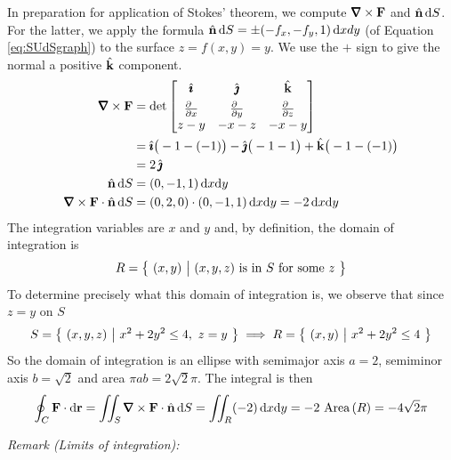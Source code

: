 \begin{eg}
In preparation for application of Stokes' theorem, we compute
$\vnabla\times\vF$ and $\hat{\mathbf{n}}\,\mathrm{d}S$. For the latter, we apply the formula
$\hat{\mathbf{n}}\,\mathrm{d}S=\pm(-f_x,-f_y,1)\,\mathrm{d}xdy$ (of Equation \eqref{eq:SUdSgraph})
to the surface $z=f(x,y)=y$. We use the $+$
sign to give the normal a positive $\hat{\mathbf{k}}$ component.
\begin{align*}
\vnabla\times\vF
&=\det\left[\begin{matrix}\hi&\hj&\hk \\[0.05in]
           \frac{\partial\hfill}{\partial x}
                 &\frac{\partial\hfill}{\partial y}
                 &\frac{\partial\hfill}{\partial z}\\
                 z-y&-x-z&-x-y\end{matrix}\right] \\
&=\hi\big(-1-(-1)\big)-\hj\big(-1-1\big)+\hk\big(-1-(-1)\big) \\
&=2\,\hj\\
\hn\,\dee{S}&=(0,-1,1)\,\dee{x}\dee{y}\\
\vnabla\times\vF\cdot\hn\,\dee{S}&=(0,2,0)\cdot(0,-1,1)\,\dee{x}\dee{y}
=-2\,\dee{x}\dee{y}
\end{align*}
The integration variables are $x$ and $y$ and, by definition, 
the domain of integration is
\begin{equation*}
R=\big\{ \ (x,y)\ \big|\ (x,y,z)\text{ is in }S\text{ for some }z\ \big\}
\end{equation*}
To determine precisely what this domain of integration is, we observe that
since $z=y$ on $S$
\begin{equation*}
S=\big\{ \ (x,y,z)\ \big|\ x^2+2y^2\le 4,\ z=y\ \big\}
\implies R=\big\{ \ (x,y)\ \big|\ x^2+2y^2\le 4\ \big\}
\end{equation*}
So the domain of integration is an ellipse with semimajor axis $a=2$,
semiminor axis $b=\sqrt{2}$ and area $\pi a b=2\sqrt{2}\pi$. The integral is then
\begin{equation*}
\oint_C\vF\cdot \dee{\vr}
=\dblInt_S \vnabla\times\vF\cdot\hn\,\dee{S}
=\dblInt_R (-2)\,\dee{x}\dee{y}
=-2\ \text{Area}\,(R)
=-4\sqrt{2}\pi
\end{equation*}

\medskip
\noindent
\emph{Remark (Limits of integration):}


\end{eg}
